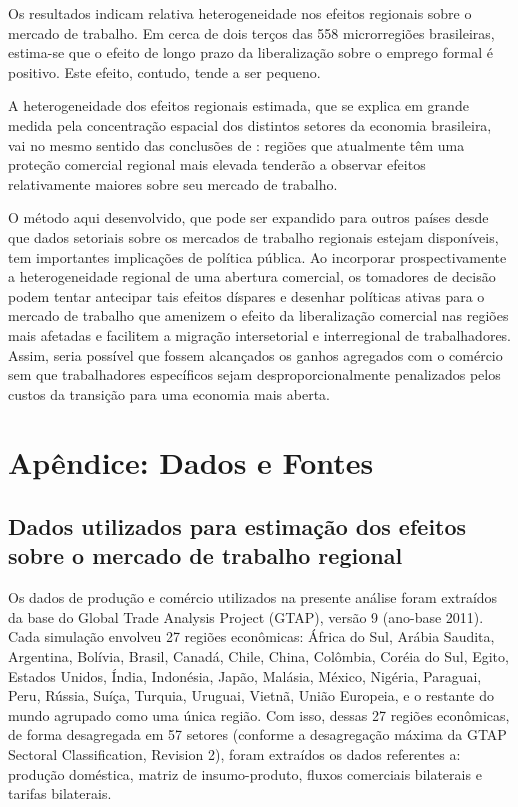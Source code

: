 \documentclass{article}
\begin{document}
Os resultados indicam relativa heterogeneidade nos efeitos regionais sobre o mercado de trabalho. Em cerca de dois terços das 558 microrregiões brasileiras, estima-se que o efeito de longo prazo da liberalização sobre o emprego formal é positivo. Este efeito, contudo, tende a ser pequeno. 

A heterogeneidade dos efeitos regionais estimada, que se explica em grande medida pela concentração espacial dos distintos setores da economia brasileira, vai no mesmo sentido das conclusões de \textcite{dixkovak}: regiões que atualmente têm uma proteção comercial regional mais elevada tenderão a observar efeitos relativamente maiores sobre seu mercado de trabalho.

O método aqui desenvolvido, que pode ser expandido para outros países desde que dados setoriais sobre os mercados de trabalho regionais estejam disponíveis, tem importantes implicações de política pública. Ao incorporar prospectivamente a heterogeneidade regional de uma abertura comercial, os tomadores de decisão podem tentar antecipar tais efeitos díspares e desenhar políticas ativas para o mercado de trabalho que amenizem o efeito da liberalização comercial nas regiões mais afetadas e facilitem a migração intersetorial e interregional de trabalhadores. Assim, seria possível que fossem alcançados os ganhos agregados com o comércio sem que trabalhadores específicos sejam desproporcionalmente penalizados pelos custos da transição para uma economia mais aberta.

\printbibliography

\newpage

\appendix
{}
\section{Apêndice: Dados e Fontes}

\subsection{Dados utilizados para estimação dos efeitos sobre o mercado de trabalho regional}

Os dados de produção e comércio utilizados na presente análise foram extraídos da base do Global Trade Analysis Project (GTAP), versão 9 (ano-base 2011). Cada simulação envolveu 27 regiões econômicas: África do Sul, Arábia Saudita, Argentina, Bolívia, Brasil, Canadá, Chile, China, Colômbia, Coréia do Sul, Egito, Estados Unidos, Índia, Indonésia, Japão, Malásia, México, Nigéria, Paraguai, Peru, Rússia, Suíça, Turquia, Uruguai, Vietnã, União Europeia, e o restante do mundo agrupado como uma única região. Com isso, dessas 27 regiões econômicas, de forma desagregada em 57 setores (conforme a desagregação máxima da GTAP Sectoral Classification, Revision 2), foram extraídos os dados referentes a: produção doméstica, matriz de insumo-produto, fluxos comerciais bilaterais e tarifas bilaterais.
\end{document}
